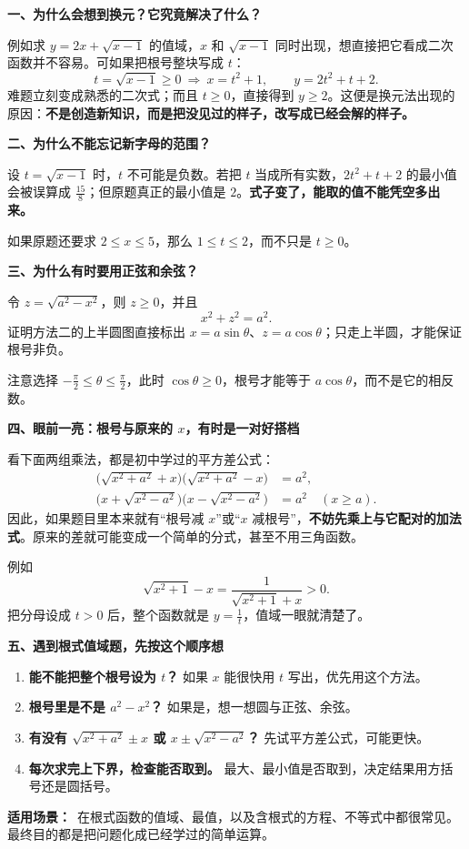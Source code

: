 \clearpage
\begin{explanationbox}
  \textbf{\textcolor{CExplanation}{一、为什么会想到换元？它究竟解决了什么？}}

  例如求 $y=2x+\sqrt{x-1}$ 的值域，$x$ 和 $\sqrt{x-1}$ 同时出现，想直接把它看成二次函数并不容易。可如果把根号整块写成 $t$：
  \[
    t=\sqrt{x-1}\ge0\ \Longrightarrow\ x=t^2+1,
    \qquad y=2t^2+t+2.
  \]
  难题立刻变成熟悉的二次式；而且 $t\ge0$，直接得到 $y\ge2$。这便是换元法出现的原因：\textbf{不是创造新知识，而是把没见过的样子，改写成已经会解的样子。}

  \medskip
  \textbf{\textcolor{CExplanation}{二、为什么不能忘记新字母的范围？}}

  设 $t=\sqrt{x-1}$ 时，$t$ 不可能是负数。若把 $t$ 当成所有实数，$2t^2+t+2$ 的最小值会被误算成 $\frac{15}{8}$；但原题真正的最小值是 $2$。\textbf{式子变了，能取的值不能凭空多出来。}

  如果原题还要求 $2\le x\le5$，那么 $1\le t\le2$，而不只是 $t\ge0$。

  \medskip
  \textbf{\textcolor{CExplanation}{三、为什么有时要用正弦和余弦？}}

  令 $z=\sqrt{a^2-x^2}$，则 $z\ge0$，并且
  \[
    x^2+z^2=a^2.
  \]
  证明方法二的上半圆图直接标出 $x=a\sin\theta$、$z=a\cos\theta$；只走上半圆，才能保证根号非负。

  注意选择 $-\frac{\pi}{2}\le\theta\le\frac{\pi}{2}$，此时 $\cos\theta\ge0$，根号才能等于 $a\cos\theta$，而不是它的相反数。

  \medskip
  \textbf{\textcolor{CExplanation}{四、眼前一亮：根号与原来的 $x$，有时是一对好搭档}}

  看下面两组乘法，都是初中学过的平方差公式：
  \[
    \begin{aligned}
      \bigl(\sqrt{x^2+a^2}+x\bigr)
      \bigl(\sqrt{x^2+a^2}-x\bigr)&=a^2,\\
      \bigl(x+\sqrt{x^2-a^2}\bigr)
      \bigl(x-\sqrt{x^2-a^2}\bigr)&=a^2\quad(x\ge a).
    \end{aligned}
  \]
  因此，如果题目里本来就有“根号减 $x$”或“$x$ 减根号”，\textbf{不妨先乘上与它配对的加法式}。原来的差就可能变成一个简单的分式，甚至不用三角函数。

  例如
  \[
    \sqrt{x^2+1}-x=\frac{1}{\sqrt{x^2+1}+x}>0.
  \]
  把分母设成 $t>0$ 后，整个函数就是 $y=\frac1t$，值域一眼就清楚了。

  \medskip
  \textbf{\textcolor{CExplanation}{五、遇到根式值域题，先按这个顺序想}}
  \begin{enumerate}[leftmargin=*,itemsep=0.45em]
    \item \textbf{能不能把整个根号设为 $t$？} 如果 $x$ 能很快用 $t$ 写出，优先用这个方法。
    \item \textbf{根号里是不是 $a^2-x^2$？} 如果是，想一想圆与正弦、余弦。
    \item \textbf{有没有 $\sqrt{x^2+a^2}\pm x$ 或 $x\pm\sqrt{x^2-a^2}$？} 先试平方差公式，可能更快。
    \item \textbf{每次求完上下界，检查能否取到。} 最大、最小值是否取到，决定结果用方括号还是圆括号。
  \end{enumerate}

  \textbf{\textcolor{CExplanation}{适用场景：}}\ 在根式函数的值域、最值，以及含根式的方程、不等式中都很常见。最终目的都是把问题化成已经学过的简单运算。
\end{explanationbox}
